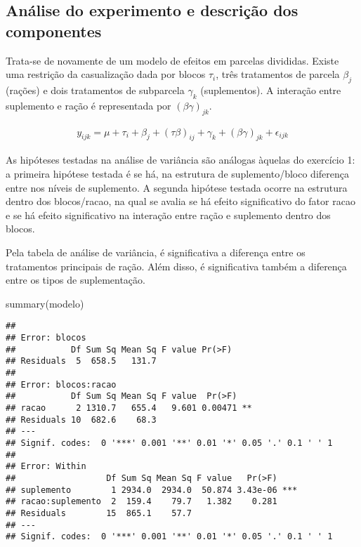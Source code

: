 \documentclass[
]{article}
\newenvironment{Shaded}{\begin{snugshade}}{\end{snugshade}}
\newcommand{\FunctionTok}[1]{\textcolor[rgb]{0.00,0.00,0.00}{#1}}
\newcommand{\NormalTok}[1]{#1}
\begin{document}
\hypertarget{anuxe1lise-do-experimento-e-descriuxe7uxe3o-dos-componentes}{%
\subsection{Análise do experimento e descrição dos
componentes}\label{anuxe1lise-do-experimento-e-descriuxe7uxe3o-dos-componentes}}

Trata-se de novamente de um modelo de efeitos em parcelas divididas.
Existe uma restrição da casualização dada por blocos \(\tau_i\), três
tratamentos de parcela \(\beta_j\) (rações) e dois tratamentos de
subparcela \(\gamma_k\) (suplementos). A interação entre suplemento e
ração é representada por \((\beta\gamma)_{jk}\).

\begin{align}
  y_{ijk} = \mu + \tau_i + \beta_j + (\tau\beta)_{ij} + \gamma_k + (\beta\gamma)_{jk} + \epsilon_{ijk}
\end{align}

As hipóteses testadas na análise de variância são análogas àquelas do
exercício 1: a primeira hipótese testada é se há, na estrutura de
suplemento/bloco diferença entre nos níveis de suplemento. A segunda
hipótese testada ocorre na estrutura dentro dos blocos/racao, na qual se
avalia se há efeito significativo do fator racao e se há efeito
significativo na interação entre ração e suplemento dentro dos blocos.

Pela tabela de análise de variância, é significativa a diferença entre
os tratamentos principais de ração. Além disso, é significativa também a
diferença entre os tipos de suplementação.

\begin{Shaded}
\begin{Highlighting}[]
\FunctionTok{summary}\NormalTok{(modelo)}
\end{Highlighting}
\end{Shaded}

\begin{verbatim}
## 
## Error: blocos
##           Df Sum Sq Mean Sq F value Pr(>F)
## Residuals  5  658.5   131.7               
## 
## Error: blocos:racao
##           Df Sum Sq Mean Sq F value  Pr(>F)   
## racao      2 1310.7   655.4   9.601 0.00471 **
## Residuals 10  682.6    68.3                   
## ---
## Signif. codes:  0 '***' 0.001 '**' 0.01 '*' 0.05 '.' 0.1 ' ' 1
## 
## Error: Within
##                  Df Sum Sq Mean Sq F value   Pr(>F)    
## suplemento        1 2934.0  2934.0  50.874 3.43e-06 ***
## racao:suplemento  2  159.4    79.7   1.382    0.281    
## Residuals        15  865.1    57.7                     
## ---
## Signif. codes:  0 '***' 0.001 '**' 0.01 '*' 0.05 '.' 0.1 ' ' 1
\end{verbatim}
\end{document}
